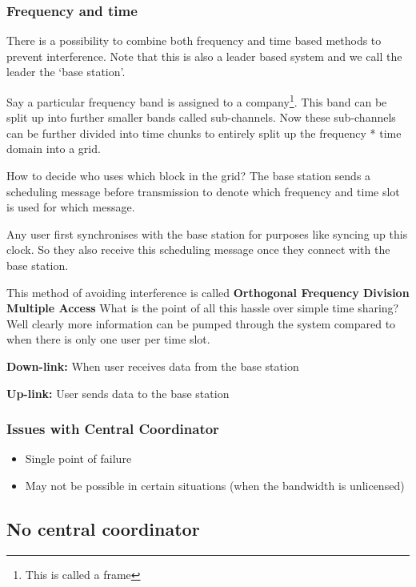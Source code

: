 \documentclass[12pt]{article}
\begin{document}
\subsubsection{Frequency and time}

There is a possibility to combine both frequency and time based methods to prevent 
interference. Note that this is also a leader based system and we call the leader the `base station'. 

Say a particular frequency band is assigned to a company\footnote{This is called a frame}. This band can 
be split up into further smaller bands called sub-channels. Now these sub-channels can be further divided into time 
chunks to entirely split up the frequency * time domain into a grid. 


How to decide who uses which block in the grid? The base station sends a scheduling message before transmission
to denote which frequency and time slot is used for which message. 

Any user first synchronises with the base station for purposes like syncing up this clock. So they also 
receive this scheduling message once they connect with the base station. 


This method of avoiding interference is called \textbf{Orthogonal Frequency Division Multiple Access}
What is the point of all this hassle over simple time sharing? 
Well clearly more information can be pumped through the system compared to when there is only 
one user per time slot.


\textbf{Down-link:} When user receives data from the base station

\textbf{Up-link:} User sends data to the base station


\subsubsection{Issues with Central Coordinator}
\begin{itemize}
\item Single point of failure
\item May not be possible in certain situations (when the bandwidth is unlicensed)
\end{itemize}
\subsection{No central coordinator}
\end{document}
